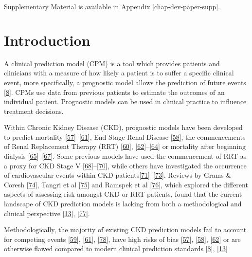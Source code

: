 \documentclass[12pt,PhD,twoside,openright]{muthesis}
\begin{document}
Supplementary Material is available in Appendix \ref{chap-dev-paper-supp}.

\hypertarget{introduction-7}{%
\section{Introduction}\label{introduction-7}}

A clinical prediction model (CPM) is a tool which provides patients and clinicians with a measure of how likely a patient is to suffer a specific clinical event, more specifically, a prognostic model allows the prediction of future events {[}\protect\hyperlink{ref-steyerberg_prognosis_2013}{8}{]}. CPMs use data from previous patients to estimate the outcomes of an individual patient. Prognostic models can be used in clinical practice to influence treatment decisions.

Within Chronic Kidney Disease (CKD), prognostic models have been developed to predict mortality {[}\protect\hyperlink{ref-johnson_predicting_2007}{57}{]}--{[}\protect\hyperlink{ref-wick_clinical_2017}{61}{]}, End-Stage Renal Disease {[}\protect\hyperlink{ref-landray_prediction_2010}{58}{]}, the commencements of Renal Replacement Therapy (RRT) {[}\protect\hyperlink{ref-marks_looking_2015}{60}{]}, {[}\protect\hyperlink{ref-johnson_predicting_2008}{62}{]}--{[}\protect\hyperlink{ref-kulkarni_transition_2017}{64}{]} or mortality after beginning dialysis {[}\protect\hyperlink{ref-floege_development_2015}{65}{]}--{[}\protect\hyperlink{ref-cao_predicting_2015}{67}{]}. Some previous models have used the commencement of RRT as a proxy for CKD Stage V {[}\protect\hyperlink{ref-tangri_predictive_2011}{68}{]}--{[}\protect\hyperlink{ref-tangri_dynamic_2017}{70}{]}, while others have investigated the occurrence of cardiovascular events within CKD patients{[}\protect\hyperlink{ref-shlipak_cardiovascular_2005}{71}{]}--{[}\protect\hyperlink{ref-mcmurray_predictors_2011}{73}{]}. Reviews by Grams \& Coresh {[}\protect\hyperlink{ref-grams_assessing_2013}{74}{]}, Tangri et al {[}\protect\hyperlink{ref-tangri_risk_2013}{75}{]} and Ramspek et al {[}\protect\hyperlink{ref-ramspek_prediction_2017}{76}{]}, which explored the different aspects of assessing risk amongst CKD or RRT patients, found that the current landscape of CKD prediction models is lacking from both a methodological and clinical perspective {[}\protect\hyperlink{ref-collins_transparent_2015}{13}{]}, {[}\protect\hyperlink{ref-bouwmeester_reporting_2012-1}{77}{]}.

Methodologically, the majority of existing CKD prediction models fail to account for competing events {[}\protect\hyperlink{ref-bansal_development_2015}{59}{]}, {[}\protect\hyperlink{ref-wick_clinical_2017}{61}{]}, {[}\protect\hyperlink{ref-perotte_risk_2015}{78}{]}, have high risks of bias {[}\protect\hyperlink{ref-johnson_predicting_2007}{57}{]}, {[}\protect\hyperlink{ref-landray_prediction_2010}{58}{]}, {[}\protect\hyperlink{ref-johnson_predicting_2008}{62}{]} or are otherwise flawed compared to modern clinical prediction standards {[}\protect\hyperlink{ref-steyerberg_prognosis_2013}{8}{]}, {[}\protect\hyperlink{ref-collins_transparent_2015}{13}{]}
\end{document}
